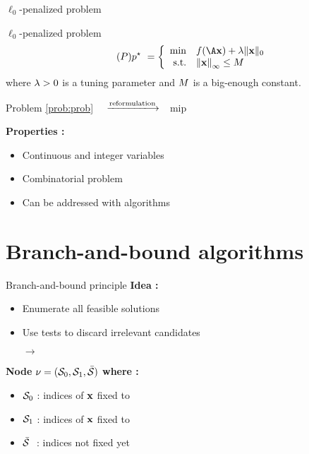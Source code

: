 \documentclass[10pt]{beamer}
\begin{document}
\begin{frame}{$\ell_0$-penalized problem}
  \begin{block}{$\ell_0$-penalized problem}
    \begin{equation}
      \label{prob:prob} \tag{\(\mpb\)}
      \optobj \ =
      \left\{
      \begin{array}{rl}
        \min & \datafunc(\dic\pv) + \reg \norm{\pv}{0}\\
        \text{s.t.} & \kvvbar{\pv}_{\infty} \leq \bigM
      \end{array}
      \right.
    \end{equation}
    where $\lambda > 0$ is a tuning parameter and $M$ is a big-enough constant.
  \end{block}

  \pause

  \begin{center}
    Problem \eqref{prob:prob} $\quad \xlongrightarrow{\text{reformulation}} \quad$\glsdesc{mip}
  \end{center}

  \pause

  \textbf{Properties :}
  \begin{itemize}
    \item Continuous and integer variables
    \item Combinatorial problem
    \item Can be addressed with  algorithms
  \end{itemize}
\end{frame}

\section{Branch-and-bound algorithms}

\begin{frame}{Branch-and-bound principle}
  \textbf{Idea :}
  \begin{itemize}
    \item Enumerate all feasible solutions
    \pause
    \item Use tests to discard irrelevant candidates
    \pause
    \item[$\rightarrow$]  
  \end{itemize}

  \pause

  \textbf{Node} $\nu = (\mathcal{S}_0,\mathcal{S}_1,\bar{\mathcal{S}})$ \textbf{where :}
  \begin{itemize}
    \item $\mathcal{S}_0$ : indices of $\mathbf{x}$ fixed to 
    \item $\mathcal{S}_1$ : indices of $\mathbf{x}$ fixed to 
    \item $\bar{\mathcal{S}} \ $ : indices not fixed yet
  \end{itemize}

  \pause

  \begin{figure}
    \centering
    \scalebox{0.7}{}
  \end{figure}
\end{frame}
\end{document}
